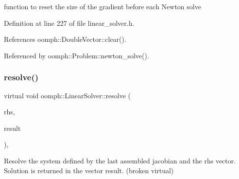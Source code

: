 function to reset the size of the gradient before each Newton solve 



Definition at line 227 of file linear\+\_\+solver.\+h.



References oomph\+::\+Double\+Vector\+::clear().



Referenced by oomph\+::\+Problem\+::newton\+\_\+solve().

\mbox{\label{classoomph_1_1LinearSolver_a3b310d08333033edc119b2a5bd7dcbfb}} 
\subsubsection{\texorpdfstring{resolve()}{resolve()}}
{\footnotesize\ttfamily virtual void oomph\+::\+Linear\+Solver\+::resolve (\begin{DoxyParamCaption}\item[{const \hyperlink{classoomph_1_1DoubleVector}{Double\+Vector} \&}]{rhs,  }\item[{\hyperlink{classoomph_1_1DoubleVector}{Double\+Vector} \&}]{result }\end{DoxyParamCaption})\hspace{0.3cm}{\ttfamily [inline]}, {\ttfamily [virtual]}}



Resolve the system defined by the last assembled jacobian and the rhs vector. Solution is returned in the vector result. (broken virtual) 



